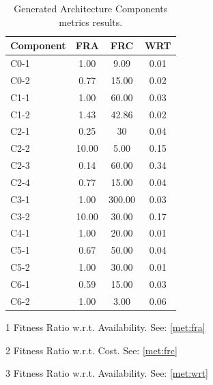\begin{table}[ht!b]
\centering
\begin{threeparttable}
	\begin{tabular}{|l|c|c|c|}
		\hline 
		\textbf{Component} & \textbf{FRA}\tnote{1} & \textbf{FRC}\tnote{2} & \textbf{WRT}\tnote{3} \\ 
		\hline 
		C0-1 & 1.00 & 9.09 & 0.01 \\
		\hline 
		C0-2 & 0.77 & 15.00 & 0.02 \\
		\hline 
		C1-1 & 1.00 & 60.00 & 0.03 \\
		\hline 
		C1-2 & 1.43 & 42.86 & 0.02 \\
		\hline
		C2-1 & 0.25 & 30 & 0.04 \\
		\hline
		C2-2 & 10.00 & 5.00 & 0.15 \\
		\hline
		C2-3 & 0.14 & 60.00 & 0.34 \\
		\hline
		C2-4 & 0.77 & 15.00 & 0.04 \\
		\hline
		C3-1 & 1.00 & 300.00 & 0.03 \\
		\hline
		C3-2 & 10.00 & 30.00 & 0.17 \\
		\hline
		C4-1 & 1.00 & 20.00 & 0.01 \\
		\hline
		C5-1 & 0.67 & 50.00 & 0.04 \\
		\hline
		C5-2 & 1.00 & 30.00 & 0.01 \\
		\hline
		C6-1 & 0.59 & 15.00 & 0.03 \\
		\hline
		C6-2 & 1.00 & 3.00 & 0.06 \\
		\hline
	\end{tabular} 
	\begin{tablenotes}\footnotesize
	\item[1] Fitness Ratio w.r.t. Availability. See: \ref{met:fra}
	\item[2] Fitness Ratio w.r.t. Cost. See: \ref{met:frc}
	\item[3] Fitness Ratio w.r.t. Availability. See: \ref{met:wrt}
	\end{tablenotes}
\end{threeparttable}
	\caption[Generated Architecture Service Components Metrics]{Generated Architecture Components metrics results.}
	\label{tab:ag-comp-res}
\end{table}

